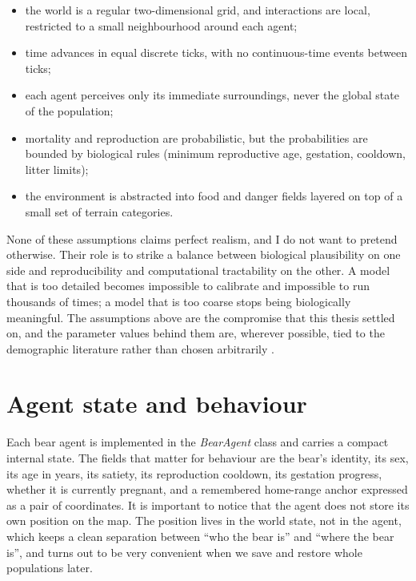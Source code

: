 \begin{itemize}
    \item the world is a regular two-dimensional grid, and interactions are local, restricted to a small neighbourhood around each agent;
    \item time advances in equal discrete ticks, with no continuous-time events between ticks;
    \item each agent perceives only its immediate surroundings, never the global state of the population;
    \item mortality and reproduction are probabilistic, but the probabilities are bounded by biological rules (minimum reproductive age, gestation, cooldown, litter limits);
    \item the environment is abstracted into food and danger fields layered on top of a small set of terrain categories.
\end{itemize}

None of these assumptions claims perfect realism, and I do not want to pretend otherwise. Their role is to strike a balance between biological plausibility on one side and reproducibility and computational tractability on the other. A model that is too detailed becomes impossible to calibrate and impossible to run thousands of times; a model that is too coarse stops being biologically meaningful. The assumptions above are the compromise that this thesis settled on, and the parameter values behind them are, wherever possible, tied to the demographic literature rather than chosen arbitrarily \cite{Swenson2000,Schwartz2003}.

\section{Agent state and behaviour}

Each bear agent is implemented in the \emph{BearAgent} class and carries a compact internal state. The fields that matter for behaviour are the bear's identity, its sex, its age in years, its satiety, its reproduction cooldown, its gestation progress, whether it is currently pregnant, and a remembered home-range anchor expressed as a pair of coordinates. It is important to notice that the agent does not store its own position on the map. The position lives in the world state, not in the agent, which keeps a clean separation between ``who the bear is'' and ``where the bear is'', and turns out to be very convenient when we save and restore whole populations later.

